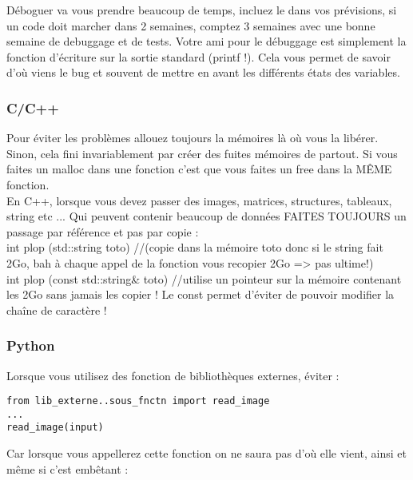 Déboguer va vous prendre beaucoup de temps, incluez le dans vos prévisions, si un code doit marcher 
dans 2 semaines, comptez 3 semaines avec une bonne semaine de debuggage et de tests. Votre ami pour
 le débuggage est simplement la fonction d'écriture sur la sortie standard (printf !). Cela vous 
permet de savoir d'où  viens le bug et souvent de mettre en avant les différents états des variables.\\


\subsubsection*{C/C++}

Pour éviter les problèmes allouez toujours la mémoires là où vous la libérer. Sinon, cela
fini invariablement par créer des fuites mémoires de partout. Si vous faites 
un malloc dans une fonction c'est que vous faites un free dans la MÊME fonction. \\

En C++, lorsque vous devez passer des images, matrices, structures, tableaux, string  etc ... Qui 
peuvent contenir beaucoup de données FAITES TOUJOURS un passage par référence et pas par copie :\\

int plop (std::string toto) //(copie dans la mémoire toto donc si le string fait 2Go, bah à chaque
 appel de la fonction vous recopier 2Go => pas ultime!)\\

int plop (const std::string\& toto) //utilise un pointeur sur la mémoire contenant les 2Go sans
 jamais les copier ! Le const permet d'éviter de pouvoir modifier la chaîne de caractère !\\

\subsubsection*{Python}

Lorsque vous utilisez des fonction de bibliothèques externes, éviter : \\

\begin{lstlisting}[style=pythonsty]
from lib_externe..sous_fnctn import read_image
...
read_image(input)
\end{lstlisting}
Car lorsque vous appellerez cette fonction on ne saura pas d'où elle vient, ainsi et même si 
c'est embêtant : \\

